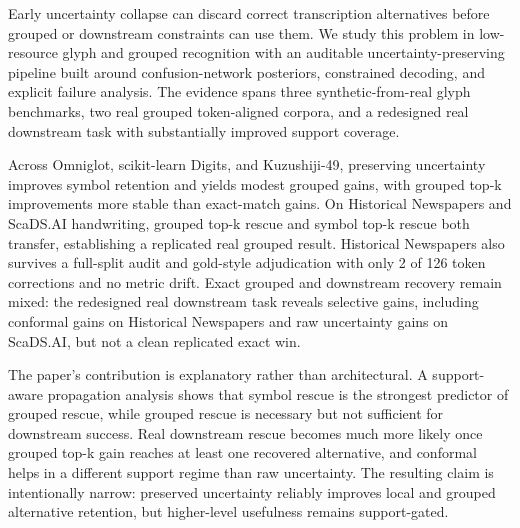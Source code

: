 Early uncertainty collapse can discard correct transcription alternatives before grouped or downstream constraints can use them. We study this problem in low-resource glyph and grouped recognition with an auditable uncertainty-preserving pipeline built around confusion-network posteriors, constrained decoding, and explicit failure analysis. The evidence spans three synthetic-from-real glyph benchmarks, two real grouped token-aligned corpora, and a redesigned real downstream task with substantially improved support coverage.

Across Omniglot, scikit-learn Digits, and Kuzushiji-49, preserving uncertainty improves symbol retention and yields modest grouped gains, with grouped top-k improvements more stable than exact-match gains. On Historical Newspapers and ScaDS.AI handwriting, grouped top-k rescue and symbol top-k rescue both transfer, establishing a replicated real grouped result. Historical Newspapers also survives a full-split audit and gold-style adjudication with only 2 of 126 token corrections and no metric drift. Exact grouped and downstream recovery remain mixed: the redesigned real downstream task reveals selective gains, including conformal gains on Historical Newspapers and raw uncertainty gains on ScaDS.AI, but not a clean replicated exact win.

The paper's contribution is explanatory rather than architectural. A support-aware propagation analysis shows that symbol rescue is the strongest predictor of grouped rescue, while grouped rescue is necessary but not sufficient for downstream success. Real downstream rescue becomes much more likely once grouped top-k gain reaches at least one recovered alternative, and conformal helps in a different support regime than raw uncertainty. The resulting claim is intentionally narrow: preserved uncertainty reliably improves local and grouped alternative retention, but higher-level usefulness remains support-gated.
